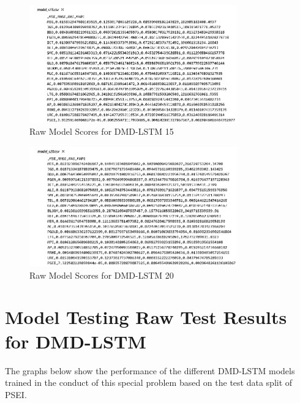 \begin{figure}[ht]
    \centering
    \includegraphics[width=0.80\textwidth]{./assets/Appendices/B/RawScores/dmdlstm15.png}
    \caption{Raw Model Scores for DMD-LSTM 15}
    \label{fig:rawScores_dmdlstm15}
\end{figure}
\FloatBarrier

\begin{figure}[ht]
    \centering
    \includegraphics[width=0.80\textwidth]{./assets/Appendices/B/RawScores/dmdlstm20.png}
    \caption{Raw Model Scores for DMD-LSTM 20}
    \label{fig:rawScores_dmdlstm20}
\end{figure}
\FloatBarrier


\section{Model Testing Raw Test Results for DMD-LSTM}
\label{sec:raw_test_dmd-lstm}
The graphs below show the performance of the different DMD-LSTM models 
trained in the conduct of this special problem based on the test data split of PSEI.

